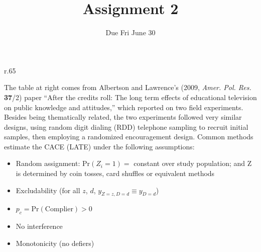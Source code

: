 \documentclass{article}
\title{Assignment 2}
\author{Due Fri June 30}
\begin{document}
\maketitle

\begin{minipage}{1.0\linewidth}

\begin{wrapfigure}{r}{.65\linewidth}
\end{wrapfigure}

The table at right comes from Albertson and Lawrence's (2009, \textit{Amer. Pol. Res.} \textbf{37}/2) paper ``After the credits roll: The long term effects of educational television on public knowledge and attitudes,'' which reported on two field experiments. Besides being thematically related, the two experiments followed very similar designs, using random digit dialing (RDD) telephone sampling to recruit initial samples, then employing a randomized encouragement design.  Common methods estimate the CACE (LATE) under the following assumptions:

\begin{itemize}
\item Random assignment: $\mathrm{Pr}(Z_{i}=1) = $ constant over study population;  and $\mathrm{Z} $ is determined by coin tosses, card shuffles or equivalent methods
\item Excludability (for all $z$, $d$, $y_{Z=z, D=d} \equiv y_{D=d}$)
\item $p_{c} = \mathrm{Pr}(\mathrm{Complier}) > 0$
\item No interference
\item Monotonicity (no defiers)
\end{itemize}

\end{minipage}
\vspace{4ex}
\end{document}
